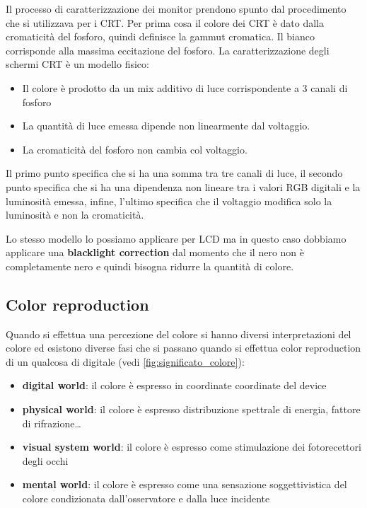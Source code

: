 Il processo di caratterizzazione dei monitor prendono spunto dal procedimento che si 
utilizzava per i CRT. Per prima cosa il colore dei CRT è dato dalla cromaticità 
del fosforo, quindi definisce la gammut cromatica. Il bianco corrisponde
alla massima eccitazione del fosforo. La caratterizzazione degli schermi CRT è un
modello fisico:
\begin{itemize}
    \item Il colore è prodotto da un mix additivo di luce corrispondente a 3 canali
          di fosforo
    \item La quantità di luce emessa dipende non linearmente dal voltaggio.
    \item La cromaticità del fosforo non cambia col voltaggio.
\end{itemize}

Il primo punto specifica che si ha una somma tra tre canali di luce, il secondo
punto specifica che si ha una dipendenza non lineare tra i valori RGB digitali e
la luminosità emessa, infine, l'ultimo specifica che il voltaggio modifica solo 
la luminosità e non la cromaticità.

Lo stesso modello lo possiamo applicare per LCD ma in questo caso dobbiamo applicare
una \textbf{blacklight correction} dal momento che il nero non è completamente nero
e quindi bisogna ridurre la quantità di colore.

\subsection{Color reproduction}
Quando si effettua una percezione del colore si hanno diversi interpretazioni 
del colore ed esistono diverse fasi che si passano quando si effettua color reproduction 
di un qualcosa di digitale (vedi \ref{fig:significato_colore}):
\begin{itemize}
    \item \textbf{digital world}: il colore è espresso in coordinate coordinate del device
    \item \textbf{physical world}: il colore è espresso distribuzione spettrale di energia, fattore di 
    rifrazione\dots
    \item \textbf{visual system world}: il colore è espresso come stimulazione dei fotorecettori degli occhi
    \item \textbf{mental world}: il colore è espresso come una sensazione soggettivistica del colore condizionata 
    dall'osservatore e dalla luce incidente
\end{itemize}

